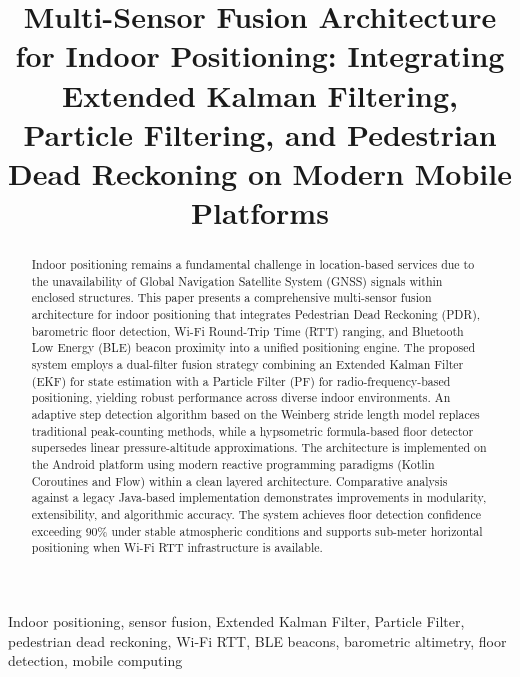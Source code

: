 \documentclass[journal,twocolumn]{IEEEtran}
\begin{document}
\title{Multi-Sensor Fusion Architecture for Indoor Positioning: Integrating Extended Kalman Filtering, Particle Filtering, and Pedestrian Dead Reckoning on Modern Mobile Platforms}

\author{
}

\maketitle

\begin{abstract}
Indoor positioning remains a fundamental challenge in location-based services due to the unavailability of Global Navigation Satellite System (GNSS) signals within enclosed structures. This paper presents a comprehensive multi-sensor fusion architecture for indoor positioning that integrates Pedestrian Dead Reckoning (PDR), barometric floor detection, Wi-Fi Round-Trip Time (RTT) ranging, and Bluetooth Low Energy (BLE) beacon proximity into a unified positioning engine. The proposed system employs a dual-filter fusion strategy combining an Extended Kalman Filter (EKF) for state estimation with a Particle Filter (PF) for radio-frequency-based positioning, yielding robust performance across diverse indoor environments. An adaptive step detection algorithm based on the Weinberg stride length model replaces traditional peak-counting methods, while a hypsometric formula-based floor detector supersedes linear pressure-altitude approximations. The architecture is implemented on the Android platform using modern reactive programming paradigms (Kotlin Coroutines and Flow) within a clean layered architecture. Comparative analysis against a legacy Java-based implementation demonstrates improvements in modularity, extensibility, and algorithmic accuracy. The system achieves floor detection confidence exceeding 90\% under stable atmospheric conditions and supports sub-meter horizontal positioning when Wi-Fi RTT infrastructure is available.
\end{abstract}

\begin{IEEEkeywords}
Indoor positioning, sensor fusion, Extended Kalman Filter, Particle Filter, pedestrian dead reckoning, Wi-Fi RTT, BLE beacons, barometric altimetry, floor detection, mobile computing
\end{IEEEkeywords}
\end{document}
